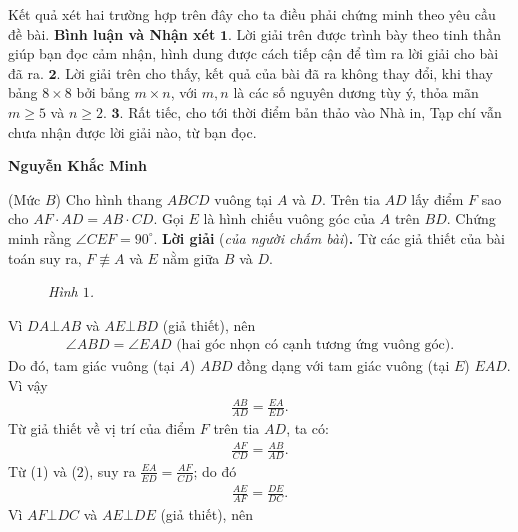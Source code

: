 \begin{multicols}{2}
	\vskip 0.05cm
	Kết quả xét hai trường hợp trên đây cho ta điều phải chứng minh theo yêu cầu đề bài.
	\vskip 0.05cm
	\textbf{Bình luận và Nhận xét}
	\vskip 0.05cm
	$\pmb{1.}$ Lời giải trên được trình bày theo tinh thần giúp bạn đọc cảm nhận, hình dung được cách tiếp cận để tìm ra lời giải cho bài đã ra.
	\vskip 0.05cm
	$\pmb{2.}$ Lời giải trên cho thấy, kết quả của bài đã ra không thay đổi, khi thay bảng $8 \times  8$ bởi bảng $m \times  n$, với $m, n$ là các số nguyên dương tùy ý, thỏa mãn $m \ge  5$ và $n \ge  2$.
	\vskip 0.05cm
	$\pmb{3.}$ Rất tiếc, cho tới thời điểm bản thảo vào Nhà in, Tạp chí vẫn chưa nhận được lời giải nào, từ bạn đọc.
	\begin{flushright}
		\textbf{Nguyễn Khắc Minh}
	\end{flushright}
	{}
	(Mức $B$) Cho hình thang $ABCD$ vuông tại $A$ và $D$. Trên tia $AD$ lấy điểm $F$ sao cho $AF\cdot AD=AB\cdot CD$. Gọi $E$ là hình chiếu vuông góc của $A$ trên $BD$. Chứng minh rằng $\angle CEF=90^\circ$. 
	\vskip 0.05cm
	\textbf{Lời giải} (\textit{của người chấm bài})\textbf{.}
	\vskip 0.05cm
	Từ các giả thiết của bài toán suy ra, $F \not\equiv A$  và $E$ nằm giữa $B$ và $D$.
	\begin{figure}[H]
		\vspace*{-5pt}
		\centering
		\captionsetup{labelformat= empty, justification=centering}
		\caption{\small\textit{\color{thachthuctoanhoc}Hình $1$.}}
		\vspace*{-10pt}
	\end{figure}
	Vì $DA \bot  AB$ và $AE \bot  BD$ (giả thiết), nên
	\begin{align*}
		\angle ABD = \angle EAD \text{ (hai góc nhọn có cạnh tương ứng vuông góc).}
	\end{align*}
	Do đó, tam giác vuông (tại $A$) $ABD$ đồng dạng với tam giác vuông (tại $E$) $EAD$. Vì vậy
	\begin{align*}
		\frac{{AB}}{{AD}} = \frac{{EA}}{{ED}}. \tag{$1$}
	\end{align*}
	Từ giả thiết về vị trí của điểm $F$ trên tia $AD$, ta có:
	\begin{align*}
		\frac{{AF}}{{CD}} = \frac{{AB}}{{AD}}. \tag{$2$}
	\end{align*}
	Từ ($1$) và ($2$), suy ra $\frac{{EA}}{{ED}} = \frac{{AF}}{{CD}}$; do đó
	\begin{align*}
		\frac{{AE}}{{AF}} = \frac{{DE}}{{DC}}. \tag{$3$}
	\end{align*}
	Vì $AF \bot  DC$ và $AE \bot  DE$ (giả thiết), nên

\end{multicols}
